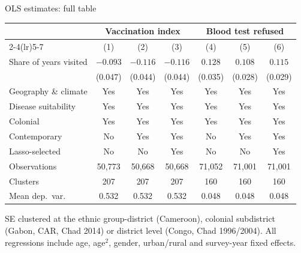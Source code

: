 \documentclass[aspectratio=1610]{beamer}
\newcommand{\returnbutton}[1]{\par\vfill\hfill\hyperlink{#1}{\beamerreturnbutton{Back}}}
\begin{document}
\begin{frame}[label=bk-ols]{OLS estimates: full table}
  \centering
  \footnotesize
  \begin{tabular}{lcccccc}
    \toprule
    & \multicolumn{3}{c}{Vaccination index} & \multicolumn{3}{c}{Blood test refused} \\
    \cmidrule(lr){2-4}\cmidrule(lr){5-7}
    & (1) & (2) & (3) & (4) & (5) & (6) \\
    \midrule
    Share of years visited & $-0.093$ & $-0.116$ & $-0.116$ & $0.128$ & $0.108$ & $0.115$ \\
                           & (0.047)  & (0.044)  & (0.044)  & (0.035) & (0.028) & (0.029) \\
    \midrule
    Geography \& climate   & Yes & Yes & Yes & Yes & Yes & Yes \\
    Disease suitability    & Yes & Yes & Yes & Yes & Yes & Yes \\
    Colonial               & Yes & Yes & Yes & Yes & Yes & Yes \\
    Contemporary           & No  & Yes & Yes & No  & Yes & Yes \\
    Lasso-selected         & No  & No  & Yes & No  & No  & Yes \\
    Observations & 50,773 & 50,668 & 50,668 & 71,052 & 71,001 & 71,001 \\
    Clusters     & 207 & 207 & 207 & 160 & 160 & 160 \\
    Mean dep.\ var. & 0.532 & 0.532 & 0.532 & 0.048 & 0.048 & 0.048 \\
    \bottomrule
  \end{tabular}

  \vspace{0.5em}
  \raggedright\scriptsize
  SE clustered at the ethnic group-district (Cameroon), colonial subdistrict (Gabon, CAR, Chad 2014)
  or district level (Congo, Chad 1996/2004). All regressions include age, age$^2$, gender, urban/rural
  and survey-year fixed effects.
  \returnbutton{main-ols}
\end{frame}
\end{document}
